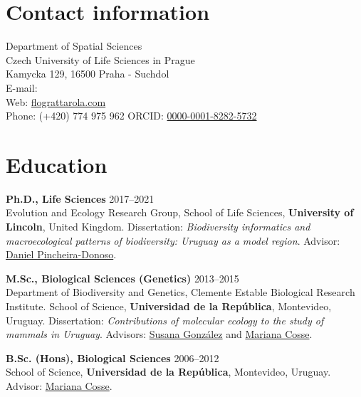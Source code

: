 
\usepackage{wasysym}





\thispagestyle{empty}

\section{Contact information}

	Department of Spatial Sciences \\
	Czech University of Life Sciences in Prague \\
	Kamycka 129, 16500 Praha - Suchdol\\
    	E-mail: \\
    	Web: \href{https://flograttarola.com}{flograttarola.com}\\
    	Phone: (+420) 774 975 962‬
	ORCID: \href{https://orcid.org/0000-0001-8282-5732}{0000-0001-8282-5732}\\ 

\HRule

\section{Education}

\begin{innerlist}

\item[]{\bf  Ph.D., Life Sciences}
\hfill {2017--2021} \\
Evolution and Ecology Research Group, School of Life Sciences, {\bf University of Lincoln}, United Kingdom. Dissertation: \textit{Biodiversity informatics and macroecological patterns of biodiversity: Uruguay as a model region}. Advisor: \href{http://selectiondynamics.weebly.com/daniel-pincheira-donoso.html}{Daniel Pincheira-Donoso}.\\

\item[]{\bf  M.Sc., Biological Sciences (Genetics)}
\hfill {2013--2015} \\
Department of Biodiversity and Genetics, Clemente Estable Biological Research Institute. School of Science, {\bf Universidad de la Rep\'{u}blica}, Montevideo, Uruguay. Dissertation: \textit{Contributions of molecular ecology
to the study of mammals in Uruguay}. Advisors: \href{https://scholar.google.com.uy/citations?user=FSrtqaMAAAAJ&hl=en}{Susana González} and \href{https://scholar.google.com/citations?user=uWh1ONQAAAAJ&hl=es}{Mariana Cosse}.\\

\item[]{\bf  B.Sc. (Hons), Biological Sciences}
\hfill {2006--2012} \\
School of Science, {\bf Universidad de la Rep\'{u}blica}, Montevideo, Uruguay. Advisor: \href{https://scholar.google.com/citations?user=uWh1ONQAAAAJ&hl=es}{Mariana Cosse}.\\

\end{innerlist}


